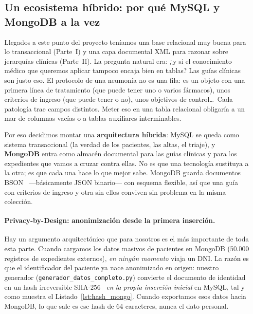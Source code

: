 \documentclass[../main.tex]{subfiles}
\begin{document}
\subsection{Un ecosistema híbrido: por qué MySQL y MongoDB a la vez}

Llegados a este punto del proyecto teníamos una base relacional muy buena para lo transaccional (Parte~I) y una capa documental XML para razonar sobre jerarquías clínicas (Parte~II). La pregunta natural era: ¿y si el conocimiento médico que queremos aplicar tampoco encaja bien en tablas? Las guías clínicas son justo eso. El protocolo de una neumonía no es una fila: es un objeto con una primera línea de tratamiento (que puede tener uno o varios fármacos), unos criterios de ingreso (que puede tener o no), unos objetivos de control\ldots\ Cada patología trae campos distintos. Meter eso en una tabla relacional obligaría a un mar de columnas vacías o a tablas auxiliares interminables.

Por eso decidimos montar una \textbf{arquitectura híbrida}: MySQL se queda como sistema transaccional (la verdad de los pacientes, las altas, el triaje), y \textbf{MongoDB} entra como almacén documental para las guías clínicas y para los expedientes que vamos a cruzar contra ellas. No es que una tecnología sustituya a la otra; es que cada una hace lo que mejor sabe. MongoDB guarda documentos BSON~\cite{bsonspec} ---básicamente JSON binario--- con esquema flexible, así que una guía con criterios de ingreso y otra sin ellos conviven sin problema en la misma colección.

\paragraph{Privacy-by-Design: anonimización desde la primera inserción.}
Hay un argumento arquitectónico que para nosotros es el más importante de toda esta parte. Cuando cargamos los datos masivos de pacientes en MongoDB (50.000 registros de expedientes externos), \textit{en ningún momento} viaja un DNI. La razón es que el identificador del paciente ya nace anonimizado en origen: nuestro generador (\texttt{generador\_datos\_completo.py}) convierte el documento de identidad en un hash irreversible SHA-256~\cite{fips180sha256} \textit{en la propia inserción inicial} en MySQL, tal y como muestra el Listado~\ref{lst:hash_mongo}. Cuando exportamos esos datos hacia MongoDB, lo que sale es ese hash de 64 caracteres, nunca el dato personal.
\end{document}
